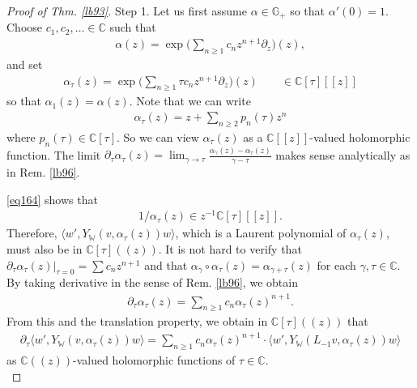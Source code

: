 \documentclass[11pt,b5paper,notitlepage]{article}
\theoremstyle{definition}
\theoremstyle{plain}
\newcommand{\bk}[1]{\langle {#1}\rangle}
\newcommand{\Wbb}{\mathbb W}
\newcommand{\Gbb}{\mathbb G}
\newcommand{\Cbb}{\mathbb C}
\numberwithin{equation}{section}
\begin{document}
\begin{proof}[Proof of Thm. \ref{lb93}]
Step 1. Let us first assume $\alpha\in\Gbb_+$ so that $\alpha'(0)=1$. Choose $c_1,c_2,\dots\in\Cbb$ such that
\begin{align}
	\alpha(z)=\exp\Big(\sum_{n\geq 1} c_nz^{n+1}\partial_z\Big)(z),\label{eq172}	
\end{align}
and set
\begin{align*}
	\alpha_\tau(z)=\exp\Big(\sum_{n\geq 1}\tau c_nz^{n+1}\partial_z\Big)(z)	\qquad\in\Cbb[\tau][[z]]
\end{align*}
so that $\alpha_1(z)=\alpha(z)$. Note that we can write
\begin{align}
	\alpha_\tau(z)=z+\sum_{n\geq 2}p_n(\tau)z^n	\label{eq164}
\end{align}
where $p_n(\tau)\in\Cbb[\tau]$. So we can view $\alpha_\tau(z)$ as a $\Cbb[[z]]$-valued holomorphic function. The limit $\partial_\tau\alpha_\tau(z)=\lim_{\gamma\rightarrow\tau}\frac{\alpha_\gamma(z)-\alpha_\tau(z)}{\gamma-\tau}$ makes sense analytically as in Rem. \ref{lb96}.

\eqref{eq164} shows that
\begin{align*}
	1/\alpha_\tau(z)\in z^{-1}\Cbb[\tau][[z]].
\end{align*}
Therefore, $\bk{w',Y_\Wbb(v,\alpha_\tau(z))w}$, which is a Laurent polynomial of $\alpha_\tau(z)$, must also be in $\Cbb[\tau]((z))$. It is not hard to verify that $\partial_\tau  \alpha_\tau(z)|_{\tau=0}=\sum c_nz^{n+1}$ and that  $\alpha_\gamma\circ\alpha_\tau(z)=\alpha_{\gamma+\tau}(z)$ for each $\gamma,\tau\in\Cbb$. By taking derivative in the sense of Rem. \ref{lb96}, we obtain
\begin{align*}
	\partial_\tau\alpha_\tau(z)=\sum_{n\geq 1}c_n\alpha_\tau(z)^{n+1}.	
\end{align*}
From this and the translation property, we obtain in $\Cbb[\tau]((z))$ that
\begin{align}
	\partial_\tau\bk{w',Y_\Wbb(v,\alpha_\tau(z))w}=\sum_{n\geq 1}c_n\alpha_\tau(z)^{n+1}\cdot \bk{w',Y_\Wbb(L_{-1}v,\alpha_\tau(z))w}\label{eq173}
\end{align}
as $\Cbb((z))$-valued holomorphic functions of $\tau\in\Cbb$.  \\


\end{proof}
\end{document}
